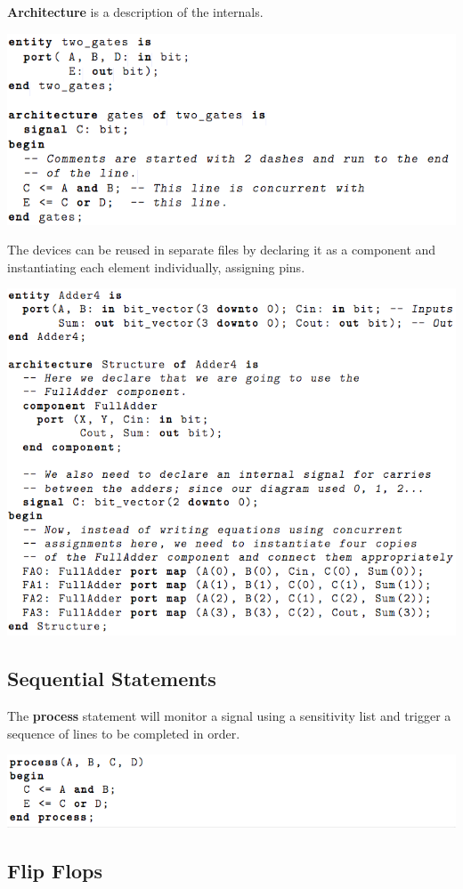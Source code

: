 \documentclass[11pt]{article}
\begin{document}
    \textbf{Architecture} is a description of the internals. \\
    
    \begin{center}
        \includegraphics[width=300 px]{vhdl} 
    \end{center}  

    The devices can be reused in separate files by declaring it as a component and instantiating each element individually, assigning pins.

    \begin{center}
        \includegraphics[width=300 px]{vhdl2} 
    \end{center}  

    \subsection{Sequential Statements}

    The \textbf{process} statement will monitor a signal using a sensitivity list and trigger a sequence of lines to be completed in order. 

    \begin{center}
        \includegraphics[width=300 px]{process} 
    \end{center} 

    \subsection{Flip Flops}
\end{document}
